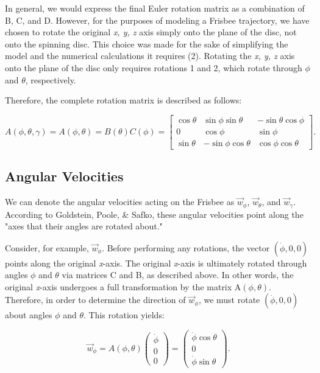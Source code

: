 \documentclass[a4paper,12pt, oneside]{article}
\begin{document}
In general, we would express the final Euler rotation matrix as a combination of B, C, and D. However, for the purposes of modeling a Frisbee trajectory, we have chosen to rotate the original \textit{x, y, z} axis simply onto the plane of the disc, not onto the spinning disc. This choice was made for the sake of simplifying the model and the numerical calculations it requires (2). Rotating the \textit{x, y, z} axis onto the plane of the disc only requires rotations 1 and 2, which rotate through $\phi$ and $\theta$, respectively.

Therefore, the complete rotation matrix is described as follows:

\begin{equation*}
A(\phi,\theta,\gamma)=A(\phi,\theta)=B(\theta)C(\phi)=\begin{bmatrix}
\cos\theta & \sin\phi\sin\theta & -\sin\theta\cos\phi \\
0 & \cos\phi & \sin\phi \\
\sin\theta & -\sin\phi\cos\theta & \cos\phi\cos\theta
\end{bmatrix}.
\end{equation*}

\subsection{Angular Velocities}
We can denote the angular velocities acting on the Frisbee as $\vec{w}_\phi$, $\vec{w}_\theta$, and $\vec{w}_\gamma$.  According to Goldstein, Poole, \& Safko, these angular velocities point along the "axes that their angles are rotated about."

Consider, for example, $\vec{w}_\phi$.  Before performing any rotations, the vector $(\dot\phi, 0, 0)$ points along the original \textit{x}-axis.  The original \textit{x}-axis is ultimately rotated through angles $\phi$ and $\theta$ via matrices C and B, as described above. In other words, the original \textit{x}-axis undergoes a full transformation by the matrix A$(\phi,\theta)$. Therefore, in order to determine the direction of $\vec{w}_\phi$, we must rotate $(\dot\phi, 0, 0)$ about angles $\phi$ and $\theta$.  This rotation yields:

\begin{equation*}
\vec{w}_\phi=A(\phi,\theta)\left(\begin{array}{ccc}\dot\phi\\0\\0\end{array} \right)=\left(\begin{array}{ccc}\dot\phi\cos\theta\\0\\\dot\phi\sin\theta\end{array} \right).
\end{equation*}
\end{document}
